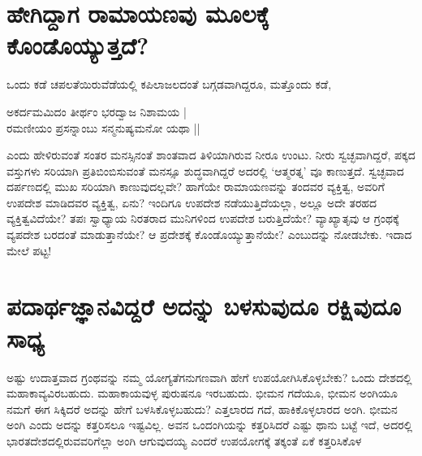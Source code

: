 \section*{ಹೇಗಿದ್ದಾಗ ರಾಮಾಯಣವು ಮೂಲಕ್ಕೆ ಕೊಂಡೊಯ್ಯುತ್ತದೆ?} 

ಒಂದು ಕಡೆ ಚಪಲತೆಯಿರುವೆಡೆಯಲ್ಲಿ ಕಪಿಲಾಜಲದಂತೆ ಬಗ್ಗಡವಾಗಿದ್ದರೂ, ಮತ್ತೊಂದು ಕಡೆ, 


\begin{shloka}
ಅಕರ್ದಮಮಿದಂ ತೀರ್ಥಂ ಭರದ್ವಾಜ ನಿಶಾಮಯ |\\ 
ರಮಣೀಯಂ ಪ್ರಸನ್ನಾಂಬು ಸನ್ಮನುಷ್ಯಮನೋ ಯಥಾ ||
\end{shloka} 


ಎಂದು ಹೇಳಿರುವಂತೆ ಸಂತರ ಮನಸ್ಸಿನಂತೆ ಶಾಂತವಾದ ತಿಳಿಯಾಗಿರುವ ನೀರೂ ಉಂಟು. ನೀರು ಸ್ವಚ್ಛವಾಗಿದ್ದರೆ, ಪಕ್ಕದ ವಸ್ತುಗಳು ಸರಿಯಾಗಿ ಪ್ರತಿಬಿಂಬಿಸುವಂತೆ ಮನಸ್ಸೂ ಶುದ್ಧವಾಗಿದ್ದರೆ ಅದರಲ್ಲಿ `ಆತ್ಮರತ್ನ' ವೂ ಕಾಣುತ್ತದೆ. ಸ್ವಚ್ಛವಾದ ದರ್ಪಣದಲ್ಲಿ ಮುಖ ಸರಿಯಾಗಿ ಕಾಣುವುದಲ್ಲವೇ? ಹಾಗೆಯೇ ರಾಮಾಯಣವನ್ನು ತಂದವರ ವ್ಯಕ್ತಿತ್ವ, ಅವರಿಗೆ ಉಪದೇಶ ಮಾಡಿದವರ ವ್ಯಕ್ತಿತ್ವ, ಏನು? ಇಂದಿಗೂ ಉಪದೇಶ ನಡೆಯುತ್ತಿದೆಯಲ್ಲಾ, ಅಲ್ಲೂ ಅದೇ ತರಹದ ವ್ಯಕ್ತಿತ್ವವಿದೆಯೇ? ತಪಃ ಸ್ವಾಧ್ಯಾಯ ನಿರತರಾದ ಮುನಿಗಳಿಂದ ಉಪದೇಶ ಬರುತ್ತಿದೆಯೇ? ವ್ಯಾಖ್ಯಾತೃವು ಆ ಗ್ರಂಥಕ್ಕೆ ವ್ಯಪದೇಶ ಬರದಂತೆ ಮಾಡುತ್ತಾನೆಯೇ? ಆ ಪ್ರದೇಶಕ್ಕೆ ಕೊಂಡೊಯ್ಯುತ್ತಾನೆಯೇ? ಎಂಬುದನ್ನು ನೋಡಬೇಕು. ಇದಾದ ಮೇಲೆ ಪಟ್ಟ! 

\section*{ಪದಾರ್ಥಜ್ಞಾನವಿದ್ದರೆ ಅದನ್ನು ಬಳಸುವುದೂ ರಕ್ಷಿವುದೂ ಸಾಧ್ಯ} 

ಅಷ್ಟು ಉದಾತ್ತವಾದ ಗ್ರಂಥವನ್ನು ನಮ್ಮ ಯೋಗ್ಯತೆಗನುಗಣವಾಗಿ ಹೇಗೆ ಉಪಯೋಗಿಸಿಕೊಳ್ಳಬೇಕು? ಒಂದು ದೇಶದಲ್ಲಿ ಮಹಾಕಾವ್ಯವಿರಬಹುದು. ಮಹಾಕಾಯವುಳ್ಳ ಪುರುಷನೂ ಇರಬಹುದು. ಭೀಮನ ಗದೆಯೂ, ಭೀಮನ ಅಂಗಿಯೂ ನಮಗೆ ಈಗ ಸಿಕ್ಕಿದರೆ ಅದನ್ನು ಹೇಗೆ ಬಳಸಿಕೊಳ್ಳಬಹುದು? ಎತ್ತಲಾರದ ಗದೆ, ಹಾಕಿಕೊಳ್ಳಲಾರದ ಅಂಗಿ. ಭೀಮನ ಅಂಗಿ ಎಂದು ಅದನ್ನು ಕತ್ತರಿಸಲೂ ಇಷ್ಟವಿಲ್ಲ. ಅವನ ಒಂದಂಗಿಯನ್ನು ಕತ್ತರಿಸಿದರೆ ಎಷ್ಟು ಥಾನು ಬಟ್ಟೆ ಇದೆ, ಅದರಲ್ಲಿ ಭಾರತದೇಶದಲ್ಲಿರುವವರಿಗೆಲ್ಲಾ ಅಂಗಿ ಆಗುವುದಯ್ಯ ಎಂದರೆ ಉಪಯೋಗಕ್ಕೆ ತಕ್ಕಂತೆ ಏಕೆ ಕತ್ತರಿಸಿಕೊಳ


